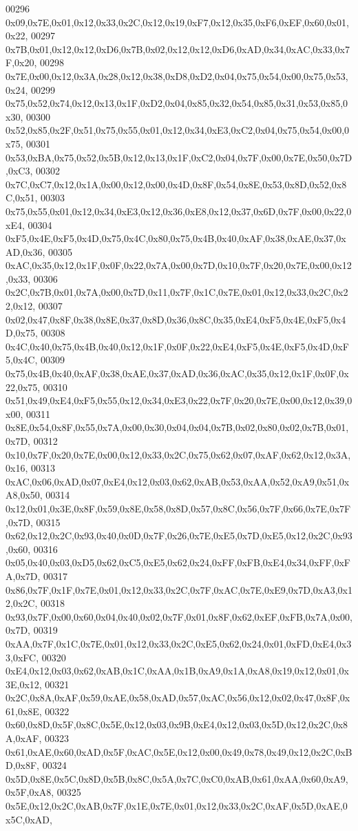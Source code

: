 \begin{DoxyCode}
00296 0x09,0x7E,0x01,0x12,0x33,0x2C,0x12,0x19,0xF7,0x12,0x35,0xF6,0xEF,0x60,0x01,0x22,
00297 0x7B,0x01,0x12,0x12,0xD6,0x7B,0x02,0x12,0x12,0xD6,0xAD,0x34,0xAC,0x33,0x7F,0x20,
00298 0x7E,0x00,0x12,0x3A,0x28,0x12,0x38,0xD8,0xD2,0x04,0x75,0x54,0x00,0x75,0x53,0x24,
00299 0x75,0x52,0x74,0x12,0x13,0x1F,0xD2,0x04,0x85,0x32,0x54,0x85,0x31,0x53,0x85,0x30,
00300 0x52,0x85,0x2F,0x51,0x75,0x55,0x01,0x12,0x34,0xE3,0xC2,0x04,0x75,0x54,0x00,0x75,
00301 0x53,0xBA,0x75,0x52,0x5B,0x12,0x13,0x1F,0xC2,0x04,0x7F,0x00,0x7E,0x50,0x7D,0xC3,
00302 0x7C,0xC7,0x12,0x1A,0x00,0x12,0x00,0x4D,0x8F,0x54,0x8E,0x53,0x8D,0x52,0x8C,0x51,
00303 0x75,0x55,0x01,0x12,0x34,0xE3,0x12,0x36,0xE8,0x12,0x37,0x6D,0x7F,0x00,0x22,0xE4,
00304 0xF5,0x4E,0xF5,0x4D,0x75,0x4C,0x80,0x75,0x4B,0x40,0xAF,0x38,0xAE,0x37,0xAD,0x36,
00305 0xAC,0x35,0x12,0x1F,0x0F,0x22,0x7A,0x00,0x7D,0x10,0x7F,0x20,0x7E,0x00,0x12,0x33,
00306 0x2C,0x7B,0x01,0x7A,0x00,0x7D,0x11,0x7F,0x1C,0x7E,0x01,0x12,0x33,0x2C,0x22,0x12,
00307 0x02,0x47,0x8F,0x38,0x8E,0x37,0x8D,0x36,0x8C,0x35,0xE4,0xF5,0x4E,0xF5,0x4D,0x75,
00308 0x4C,0x40,0x75,0x4B,0x40,0x12,0x1F,0x0F,0x22,0xE4,0xF5,0x4E,0xF5,0x4D,0xF5,0x4C,
00309 0x75,0x4B,0x40,0xAF,0x38,0xAE,0x37,0xAD,0x36,0xAC,0x35,0x12,0x1F,0x0F,0x22,0x75,
00310 0x51,0x49,0xE4,0xF5,0x55,0x12,0x34,0xE3,0x22,0x7F,0x20,0x7E,0x00,0x12,0x39,0x00,
00311 0x8E,0x54,0x8F,0x55,0x7A,0x00,0x30,0x04,0x04,0x7B,0x02,0x80,0x02,0x7B,0x01,0x7D,
00312 0x10,0x7F,0x20,0x7E,0x00,0x12,0x33,0x2C,0x75,0x62,0x07,0xAF,0x62,0x12,0x3A,0x16,
00313 0xAC,0x06,0xAD,0x07,0xE4,0x12,0x03,0x62,0xAB,0x53,0xAA,0x52,0xA9,0x51,0xA8,0x50,
00314 0x12,0x01,0x3E,0x8F,0x59,0x8E,0x58,0x8D,0x57,0x8C,0x56,0x7F,0x66,0x7E,0x7F,0x7D,
00315 0x62,0x12,0x2C,0x93,0x40,0x0D,0x7F,0x26,0x7E,0xE5,0x7D,0xE5,0x12,0x2C,0x93,0x60,
00316 0x05,0x40,0x03,0xD5,0x62,0xC5,0xE5,0x62,0x24,0xFF,0xFB,0xE4,0x34,0xFF,0xFA,0x7D,
00317 0x86,0x7F,0x1F,0x7E,0x01,0x12,0x33,0x2C,0x7F,0xAC,0x7E,0xE9,0x7D,0xA3,0x12,0x2C,
00318 0x93,0x7F,0x00,0x60,0x04,0x40,0x02,0x7F,0x01,0x8F,0x62,0xEF,0xFB,0x7A,0x00,0x7D,
00319 0xAA,0x7F,0x1C,0x7E,0x01,0x12,0x33,0x2C,0xE5,0x62,0x24,0x01,0xFD,0xE4,0x33,0xFC,
00320 0xE4,0x12,0x03,0x62,0xAB,0x1C,0xAA,0x1B,0xA9,0x1A,0xA8,0x19,0x12,0x01,0x3E,0x12,
00321 0x2C,0x8A,0xAF,0x59,0xAE,0x58,0xAD,0x57,0xAC,0x56,0x12,0x02,0x47,0x8F,0x61,0x8E,
00322 0x60,0x8D,0x5F,0x8C,0x5E,0x12,0x03,0x9B,0xE4,0x12,0x03,0x5D,0x12,0x2C,0x8A,0xAF,
00323 0x61,0xAE,0x60,0xAD,0x5F,0xAC,0x5E,0x12,0x00,0x49,0x78,0x49,0x12,0x2C,0xBD,0x8F,
00324 0x5D,0x8E,0x5C,0x8D,0x5B,0x8C,0x5A,0x7C,0xC0,0xAB,0x61,0xAA,0x60,0xA9,0x5F,0xA8,
00325 0x5E,0x12,0x2C,0xAB,0x7F,0x1E,0x7E,0x01,0x12,0x33,0x2C,0xAF,0x5D,0xAE,0x5C,0xAD,

\end{DoxyCode}
